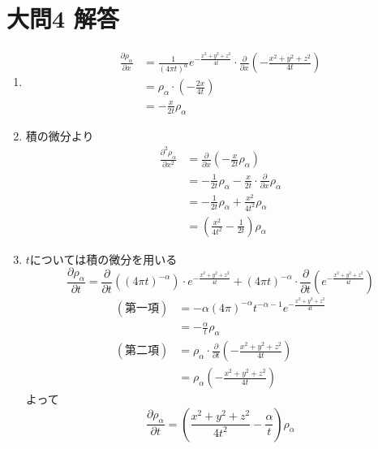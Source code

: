 \documentclass[dvipdfmx]{jsreport}
\begin{document}
\section{大問4 解答}
\begin{souanswer} %
\begin{enumerate}
	\item 
\begin{align*}
	\frac{\partial \rho_\alpha}{\partial x}
	&= \frac{1}{(4\pi t)^\alpha}e^{-\frac{x^2+ y^2+ z^2}{4t}}\cdot \frac{\partial}{\partial x}\left(-\frac{x^2+ y^2+ z^2}{4t}\right)\\
	&= \rho_\alpha\cdot\left(-\frac{2x}{4t}\right)\\
	&= -\frac{x}{2t}\rho_\alpha
\end{align*}

	\item 積の微分より
\begin{align*}
	\frac{\partial^2 \rho_\alpha}{\partial x^2}
	&= \frac{\partial}{\partial x}\left(-\frac{x}{2t}\rho_\alpha\right)\\
	&= -\frac{1}{2t}\rho_\alpha- \frac{x}{2t}\cdot \frac{\partial}{\partial x}\rho_\alpha\\
	&= -\frac{1}{2t}\rho_\alpha+ \frac{x^2}{4t^2}\rho_\alpha\\
	&= \left(\frac{x^2}{4t^2}- \frac{1}{2t}\right)\rho_\alpha
\end{align*}

	\item $t$については積の微分を用いる
\begin{equation*}
	\frac{\partial \rho_\alpha}{\partial t}
	= \frac{\partial}{\partial t}((4\pi t)^{-\alpha})\cdot e^{-\frac{x^2+ y^2+ z^2}{4t}}+ (4\pi t)^{-\alpha}\cdot \frac{\partial}{\partial t}\left(e^{-\frac{x^2+ y^2+ z^2}{4t}}\right)
\end{equation*}
\begin{align*}
	(第一項)
	&= -\alpha(4\pi)^{-\alpha}t^{-\alpha- 1}e^{-\frac{x^2+ y^2+ z^2}{4t}}\\
	&= -\frac{\alpha}{t}\rho_\alpha\\
	(第二項)
	&= \rho_\alpha\cdot \frac{\partial}{\partial t}\left({-\frac{x^2+ y^2+ z^2}{4t}}\right)\\
	&= \rho_\alpha\left({-\frac{x^2+ y^2+ z^2}{4t}}\right)
\end{align*}
	よって
\begin{equation*}
	\frac{\partial \rho_\alpha}{\partial t}= \left(\frac{x^2+ y^2+ z^2}{4t^2}- \frac{\alpha}{t}\right)\rho_\alpha
\end{equation*}


\end{enumerate}
\end{souanswer}
\end{document}

